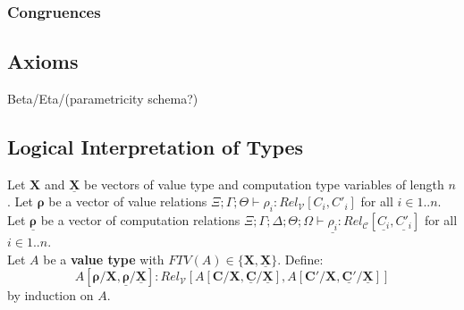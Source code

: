 \documentclass{article}
\begin{document}
\begin{prooftree}
\end{prooftree}

\begin{prooftree}
\end{prooftree}

\subsubsection{Congruences}
\begin{prooftree}
\end{prooftree}
\subsection{Axioms}
Beta/Eta/(parametricity schema?)


\subsection{Logical Interpretation of Types}
Let $\bm{X}$ and $\bm{\underline{X}}$ be vectors of value type and computation type variables of length $n$.
Let $\bm{\rho}$ be a vector of value relations $\Xi ; \Gamma ; \Theta \vdash \rho_i : Rel_{\mathcal{V}}[C_i , C'_i]$ for all $i \in {1..n}$.
Let $\bm{\underline{\rho}}$ be a vector of computation relations $\Xi ; \Gamma ; \Delta ; \Theta ; \Omega \vdash \underline{\rho_i} : Rel_{\mathcal{C}}[\underline{C_i} , \underline{C'_i}]$ for all $i \in {1..n}$.
\\Let $A$ be a \textbf{value type} with $FTV(A) \in \{\bm{X},\bm{\underline{X}}\}$. Define:
\[
  A[\bm{\rho}/\bm{X},\bm{\underline{\rho}}/\bm{\underline{X}}] : Rel_{\mathcal{V}}[A[\bm{C}/\bm{X},\bm{\underline{C}}/\bm{\underline{X}}], A[\bm{C'}/\bm{X},\bm{\underline{C'}/\bm{\underline{X}}}]] 
\] 
by induction on $A$. 
\end{document}
